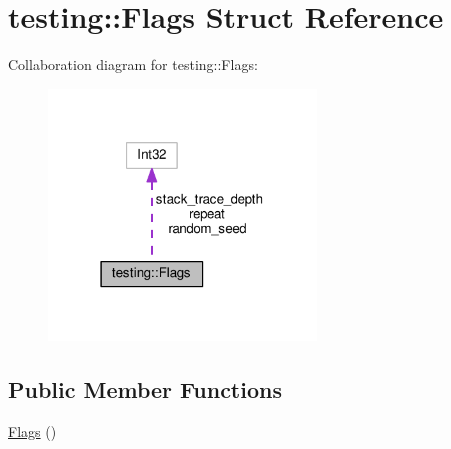 \hypertarget{structtesting_1_1Flags}{}\section{testing\+:\+:Flags Struct Reference}
\label{structtesting_1_1Flags}


Collaboration diagram for testing\+:\+:Flags\+:\nopagebreak
\begin{figure}[H]
\begin{center}
\leavevmode
\includegraphics[width=202pt]{structtesting_1_1Flags__coll__graph}
\end{center}
\end{figure}
\subsection*{Public Member Functions}
\begin{DoxyCompactItemize}
\item 
\hyperlink{structtesting_1_1Flags_a41dc8942bec08ebc7f74dee545e6ad7e}{Flags} ()
\end{DoxyCompactItemize}
